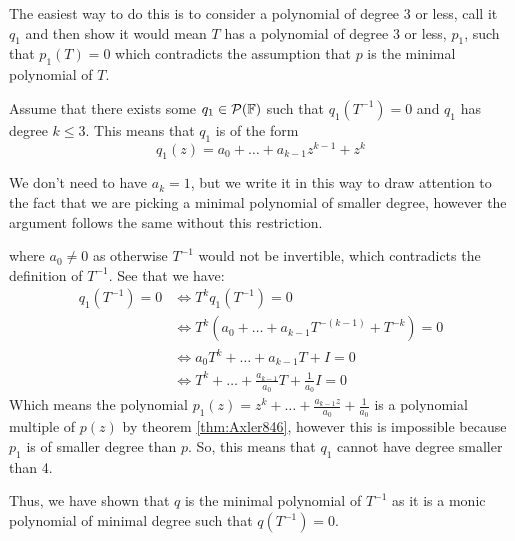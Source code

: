 \documentclass[answers]{exam}
\begin{document}
\begin{questions}
\begin{parts}
\begin{solution}
            The easiest way to do this is to consider a polynomial of degree $3$ or less, call it $q_1$ and then
            show it would mean $T$ has a polynomial of degree $3$ or less, $p_1$, such that $p_1(T) = 0$ which
            contradicts the assumption that $p$ is the minimal polynomial of $T$.

            Assume that there exists some $q_1\in\mathcal{P}(\mathbb{F})$ such that $q_1\left(T^{-1}\right) = 0$ and $q_1$
            has degree $k\leq 3$. This means that $q_1$ is of the form
            \[
                q_1(z) = a_0 + \dots + a_{k-1}z^{k-1} + z^k
            \]

             We don't need to have $a_k=1$, but we write it in this way to draw attention to the 
            fact that
            we are picking a minimal polynomial of smaller degree, however the argument follows the same
            without this restriction.

            where $a_0 \neq 0$ as otherwise $T^{-1}$ would not be invertible, which contradicts the definition
            of $T^{-1}$.
            See that we have:
            \begin{align*}
                q_1\left(T^{-1}\right) = 0 &\iff T^kq_1\left(T^{-1}\right) = 0 \\
                &\iff T^k\left(a_0 + \dots + a_{k-1}T^{-(k-1)} + T^{-k}\right) = 0 \\
                &\iff a_0T^k + \dots + a_{k-1}T + I = 0 \\
                &\iff T^k + \dots + \frac{a_{k-1}}{a_0}T + \frac{1}{a_0}I = 0
            \end{align*}
            Which means the polynomial $p_1(z) = z^k + \dots + \frac{a_{k-1}z}{a_0} + \frac{1}{a_0}$ is a 
            polynomial multiple of $p(z)$ by theorem \ref{thm:Axler846}, however this is impossible  because 
            $p_1$ is of smaller degree than $p$. So, this means that $q_1$ cannot have degree smaller than 4.

            Thus, we have shown that $q$ is the minimal polynomial of $T^{-1}$ as it is a monic polynomial of 
            minimal degree such that $q\left(T^{-1}\right) = 0$.



\end{solution}
\end{parts}
\end{questions}
\end{document}
